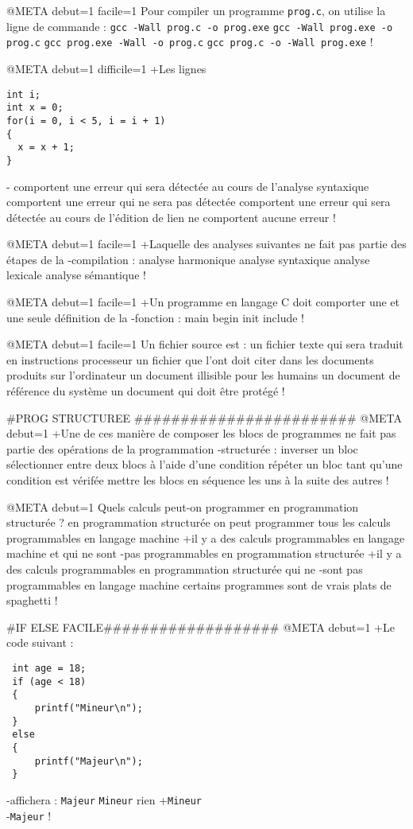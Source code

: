 @META debut=1 facile=1
Pour compiler un programme \verb|prog.c|, on utilise la ligne de commande :
 \verb|gcc -Wall prog.c -o prog.exe|
 \verb|gcc -Wall prog.exe -o prog.c|
 \verb|gcc prog.exe -Wall -o prog.c|
 \verb|gcc prog.c -o -Wall prog.exe|
!

@META debut=1 difficile=1
+Les lignes
\begin{verbatim}
int i;
int x = 0;
for(i = 0, i < 5, i = i + 1)
{
  x = x + 1;
}
\end{verbatim}
-
 comportent une erreur qui sera détectée au cours de l'analyse syntaxique
 comportent une erreur qui ne sera pas détectée
 comportent une erreur qui sera détectée au cours de l'édition de lien
 ne comportent aucune erreur
!

@META debut=1 facile=1
+Laquelle des analyses suivantes ne fait pas partie des étapes de la
-compilation :
 analyse harmonique
 analyse syntaxique
 analyse lexicale
 analyse sémantique
!

@META debut=1 facile=1
+Un programme en langage C doit comporter une et une seule définition de la
-fonction :
 main
 begin
 init
 include
!

@META debut=1 facile=1
Un fichier source est :
 un fichier texte qui sera traduit en instructions processeur
 un fichier que l'ont doit citer dans les documents produits sur l'ordinateur
 un document illisible pour les humains
 un document de référence du système
 un document qui doit être protégé
!

#PROG STRUCTUREE ########################
@META debut=1
+Une de ces manière de composer les blocs de
programmes ne fait pas partie des opérations de la programmation
-structurée :
 inverser un bloc
 sélectionner entre deux blocs à l'aide d'une condition
 répéter un bloc tant qu'une condition est vérifée
 mettre les blocs en séquence les uns à la suite des autres
!

@META debut=1
Quels calculs peut-on programmer en programmation structurée ?
 en programmation structurée on peut programmer tous les calculs programmables en langage machine
+il y a des calculs programmables en langage machine et qui ne sont
-pas programmables en programmation structurée
+il y a des calculs programmables en programmation structurée qui ne
-sont pas programmables en langage machine
 certains programmes sont de vrais plats de spaghetti
!

#IF ELSE FACILE###################
@META debut=1
+Le code suivant :
 \begin{verbatim}
 int age = 18;
 if (age < 18)
 {
     printf("Mineur\n");
 }
 else
 {
     printf("Majeur\n");
 }
 \end{verbatim}
-affichera :
 \verb|Majeur|
 \verb|Mineur|
 rien
+\verb|Mineur|\\
-\verb|Majeur|
!

